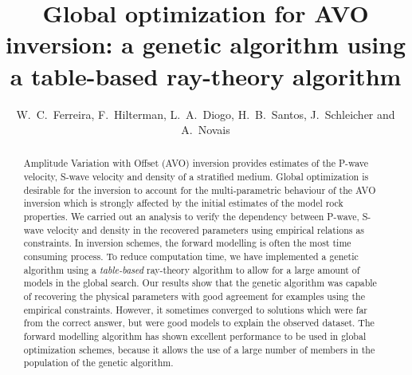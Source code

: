 \documentclass{vie16}
\begin{document}
\title{Global optimization for AVO inversion: a genetic algorithm using
a table-based ray-theory algorithm}
\author{W.~C.~Ferreira, F.~Hilterman, L.~A.~Diogo, H.~B.~Santos,
J.~Schleicher and A.~Novais}
\maketitle

\begin{abstract}
Amplitude Variation with Offset (AVO) inversion provides
estimates of the P-wave velocity, S-wave velocity and density of
a stratified medium. Global optimization is desirable
for the inversion to account for the multi-parametric behaviour
of the AVO inversion which is strongly affected by the initial
estimates of the model rock properties.  We carried out an analysis to verify
the dependency between P-wave, S-wave velocity and density in
the recovered parameters using empirical
relations as constraints. In inversion schemes, the forward
modelling is often the most time consuming process. To reduce
computation time, we have implemented a genetic algorithm using a
\textit{table-based} ray-theory algorithm to allow for 
a large amount of models in the global search. Our
results show that the genetic algorithm was capable of recovering
the physical parameters with good agreement for examples
using the empirical constraints. However, it sometimes
converged to solutions which were far from the correct answer,
but were good models to explain the observed dataset. The
forward modelling algorithm has shown excellent performance to
be used in global optimization schemes, because it allows the use of a
large number of members in the population of the genetic
algorithm.
\end{abstract}

\newpage
\end{document}
